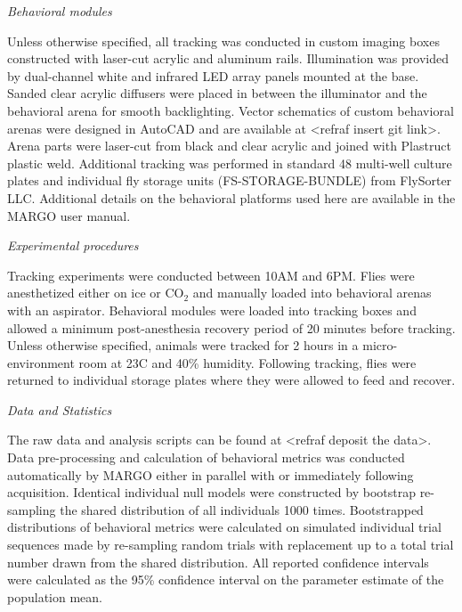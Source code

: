 \documentclass[10pt]{article}
\begin{document}
\begin{multicols}{2}
\vspace*{0.5cm}
\noindent\textit{Behavioral modules}
\vspace*{0.3cm}

Unless otherwise specified, all tracking was conducted in custom imaging boxes constructed with laser-cut acrylic and aluminum rails. Illumination was provided by dual-channel white and infrared LED array panels mounted at the base. Sanded clear acrylic diffusers were placed in between the illuminator and the behavioral arena for smooth backlighting. Vector schematics of custom behavioral arenas were designed in AutoCAD and are available at <refraf insert git link>. Arena parts were laser-cut from black and clear acrylic and joined with Plastruct plastic weld. Additional tracking was performed in standard 48 multi-well culture plates and individual fly storage units (FS-STORAGE-BUNDLE) from FlySorter LLC. Additional details on the behavioral platforms used here are available in the MARGO user manual.

\vspace*{0.5cm}
\noindent\textit{Experimental procedures}
\vspace*{0.3cm}

Tracking experiments were conducted between 10AM and 6PM. Flies were anesthetized either on ice or CO$_{2}$ and manually loaded into behavioral arenas with an aspirator. Behavioral modules were loaded into tracking boxes and allowed a minimum post-anesthesia recovery period of 20 minutes before tracking. Unless otherwise specified, animals were tracked for 2 hours in a micro-environment room at 23\degree  C and 40\% humidity. Following tracking, flies were returned to individual storage plates where they were allowed to feed and recover.

\vspace*{0.5cm}
\noindent\textit{Data and Statistics}
\vspace*{0.3cm}

The raw data and analysis scripts can be found at <refraf deposit the data>. Data pre-processing and calculation of behavioral metrics was conducted automatically by MARGO either in parallel with or immediately following acquisition. Identical individual null models were constructed by bootstrap re-sampling the shared distribution of all individuals 1000 times. Bootstrapped distributions of behavioral metrics were calculated on simulated individual trial sequences made by re-sampling random trials with replacement up to a total trial number drawn from the shared distribution. All reported confidence intervals were calculated as the 95\% confidence interval on the parameter estimate of the population mean.


\end{multicols}
\end{document}
